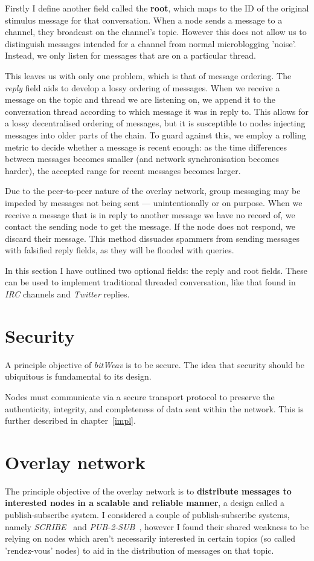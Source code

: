 \documentclass[10pt,a4paper,onecolumn]{article}
\begin{document}
Firstly I define another field called the \textbf{root}, which maps to the ID of the original stimulus message for that conversation. When a node sends a message to a channel, they broadcast on the channel's topic. However this does not allow us to distinguish messages intended for a channel from normal microblogging 'noise'. Instead, we only listen for messages that are on a particular thread. 

This leaves us with only one problem, which is that of message ordering. The \emph{reply} field aids to develop a lossy ordering of messages. When we receive a message on the topic and thread we are listening on, we append it to the conversation thread according to which message it was in reply to. This allows for a lossy decentralised ordering of messages, but it is susceptible to nodes injecting messages into older parts of the chain. To guard against this, we employ a rolling metric to decide whether a message is recent enough: as the time differences between messages becomes smaller (and network synchronisation becomes harder), the accepted range for recent messages becomes larger. 

Due to the peer-to-peer nature of the overlay network, group messaging may be impeded by messages not being sent — unintentionally or on purpose. When we receive a message that is in reply to another message we have no record of, we contact the sending node to get the message. If the node does not respond, we discard their message. This method dissuades spammers from sending messages with falsified reply fields, as they will be flooded with queries. 

In this section I have outlined two optional fields: the reply and root fields. These  can be used to implement traditional threaded conversation, like that found in \textit{IRC} channels and \textit{Twitter} replies.

\section{Security}
\label{security}
A principle objective of \textit{bitWeav} is to be secure. The idea that security should be ubiquitous is fundamental to its design.

Nodes must communicate via a secure transport protocol to preserve the authenticity, integrity, and completeness of data sent within the network. This is further described in chapter~\ref{impl}.

\section{Overlay network}
\label{network}
The principle objective of the overlay network is to \textbf{distribute messages to interested nodes in a scalable and reliable manner}, a design called a publish-subscribe system. I considered a couple of publish-subscribe systems, namely \textit{SCRIBE}~\cite{castro2002scribe} and \textit{PUB-2-SUB}~\cite{pub2sub}, however I found their shared weakness to be relying on nodes which aren't necessarily interested in certain topics (so called 'rendez-vous' nodes) to aid in the distribution of messages on that topic.
\end{document}
